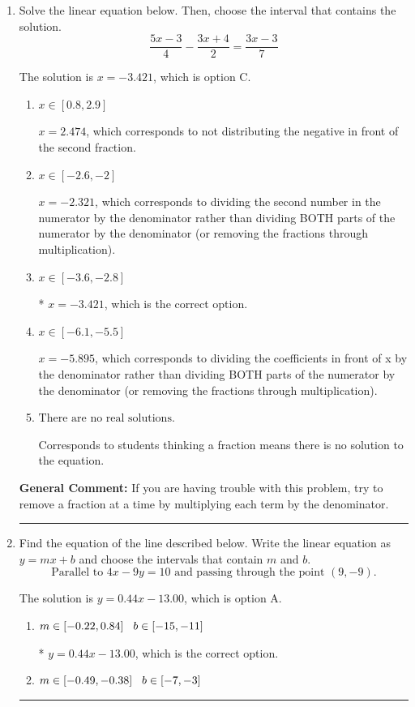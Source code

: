 \documentclass{extbook}[14pt]
\newcommand{\litem}[1]{\item #1

\rule{\textwidth}{0.4pt}}
\begin{document}
\begin{enumerate}\litem{
Solve the linear equation below. Then, choose the interval that contains the solution.
\[ \frac{5x -3}{4} - \frac{3x + 4}{2} = \frac{3x -3}{7} \]

The solution is \( x = -3.421 \), which is option C.\begin{enumerate}[label=\Alph*.]
\item \( x \in [0.8, 2.9] \)

 $x = 2.474$, which corresponds to not distributing the negative in front of the second fraction.
\item \( x \in [-2.6, -2] \)

 $x = -2.321$, which corresponds to dividing the second number in the numerator by the denominator rather than dividing BOTH parts of the numerator by the denominator (or removing the fractions through multiplication).
\item \( x \in [-3.6, -2.8] \)

* $x = -3.421$, which is the correct option.
\item \( x \in [-6.1, -5.5] \)

 $x = -5.895$, which corresponds to dividing the coefficients in front of x by the denominator rather than dividing BOTH parts of the numerator by the denominator (or removing the fractions through multiplication).
\item \( \text{There are no real solutions.} \)

Corresponds to students thinking a fraction means there is no solution to the equation.
\end{enumerate}

\textbf{General Comment:} If you are having trouble with this problem, try to remove a fraction at a time by multiplying each term by the denominator.
}
\litem{
Find the equation of the line described below. Write the linear equation as $ y=mx+b $ and choose the intervals that contain $m$ and $b$.
\[ \text{Parallel to } 4 x - 9 y = 10 \text{ and passing through the point } (9, -9). \]

The solution is \( y = 0.44x - 13.00 \), which is option A.\begin{enumerate}[label=\Alph*.]
\item \( m \in [-0.22, 0.84] \hspace*{3mm} b \in [-15, -11] \)

* $y = 0.44x - 13.00$, which is the correct option.
\item \( m \in [-0.49, -0.38] \hspace*{3mm} b \in [-7, -3] \)


\end{enumerate}}
\end{enumerate}
\end{document}
